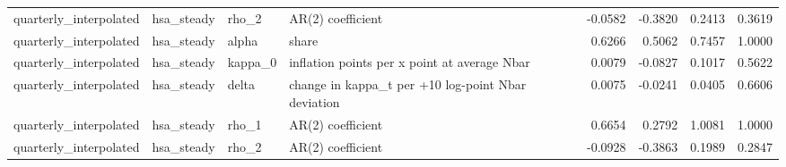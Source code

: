 \begin{tabular}{llllrrrr}
quarterly\_interpolated & hsa\_steady & rho\_2 & AR(2) coefficient & -0.0582 & -0.3820 & 0.2413 & 0.3619 \\
quarterly\_interpolated & hsa\_steady & alpha & share & 0.6266 & 0.5062 & 0.7457 & 1.0000 \\
quarterly\_interpolated & hsa\_steady & kappa\_0 & inflation points per x point at average Nbar & 0.0079 & -0.0827 & 0.1017 & 0.5622 \\
quarterly\_interpolated & hsa\_steady & delta & change in kappa\_t per +10 log-point Nbar deviation & 0.0075 & -0.0241 & 0.0405 & 0.6606 \\
quarterly\_interpolated & hsa\_steady & rho\_1 & AR(2) coefficient & 0.6654 & 0.2792 & 1.0081 & 1.0000 \\
quarterly\_interpolated & hsa\_steady & rho\_2 & AR(2) coefficient & -0.0928 & -0.3863 & 0.1989 & 0.2847 \\
\bottomrule
\end{tabular}
